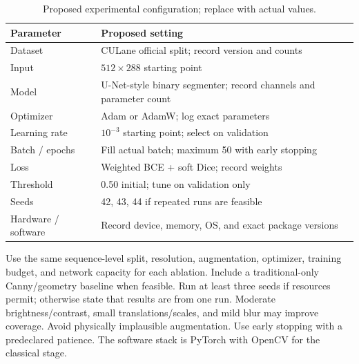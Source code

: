 \documentclass[10pt,a4paper,twocolumn]{article}
\begin{document}
\begin{table}[H]
\centering
\caption{Proposed experimental configuration; replace with actual values.}
\footnotesize
\begin{tabularx}{\columnwidth}{|l|X|}
\hline
\rowcolor{gray!18}\textbf{Parameter}&\textbf{Proposed setting}\\ \hline
Dataset & CULane official split; record version and counts\\ \hline
Input & $512\times288$ starting point\\ \hline
Model & U-Net-style binary segmenter; record channels and parameter count\\ \hline
Optimizer & Adam or AdamW; log exact parameters\\ \hline
Learning rate & $10^{-3}$ starting point; select on validation\\ \hline
Batch / epochs & Fill actual batch; maximum 50 with early stopping\\ \hline
Loss & Weighted BCE + soft Dice; record weights\\ \hline
Threshold & 0.50 initial; tune on validation only\\ \hline
Seeds & 42, 43, 44 if repeated runs are feasible\\ \hline
Hardware / software & Record device, memory, OS, and exact package versions\\ \hline
\end{tabularx}
\end{table}

Use the same sequence-level split, resolution, augmentation, optimizer, training budget, and network capacity for each ablation. Include a traditional-only Canny/geometry baseline when feasible. Run at least three seeds if resources permit; otherwise state that results are from one run. Moderate brightness/contrast, small translations/scales, and mild blur may improve coverage. Avoid physically implausible augmentation. Use early stopping with a predeclared patience. The software stack is PyTorch \cite{paszke2019} with OpenCV for the classical stage.
\end{document}
